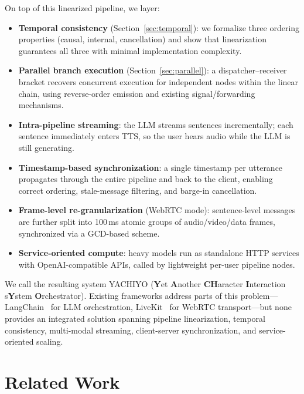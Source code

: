 \documentclass[11pt,a4paper]{article}
\begin{document}
On top of this linearized pipeline, we layer:
\begin{itemize}[nosep]
    \item \textbf{Temporal consistency} (Section~\ref{sec:temporal}): we formalize three ordering properties (causal, internal, cancellation) and show that linearization guarantees all three with minimal implementation complexity.
    \item \textbf{Parallel branch execution} (Section~\ref{sec:parallel}): a dispatcher--receiver bracket recovers concurrent execution for independent nodes within the linear chain, using reverse-order emission and existing signal/forwarding mechanisms.
    \item \textbf{Intra-pipeline streaming}: the LLM streams sentences incrementally; each sentence immediately enters TTS, so the user hears audio while the LLM is still generating.
    \item \textbf{Timestamp-based synchronization}: a single timestamp per utterance propagates through the entire pipeline and back to the client, enabling correct ordering, stale-message filtering, and barge-in cancellation.
    \item \textbf{Frame-level re-granularization} (WebRTC mode): sentence-level messages are further split into 100\,ms atomic groups of audio/video/data frames, synchronized via a GCD-based scheme.
    \item \textbf{Service-oriented compute}: heavy models run as standalone HTTP services with OpenAI-compatible APIs, called by lightweight per-user pipeline nodes.
\end{itemize}

We call the resulting system YACHIYO (\textbf{Y}et \textbf{A}nother \textbf{CH}aracter \textbf{I}nteraction s\textbf{Y}stem \textbf{O}rchestrator). Existing frameworks address parts of this problem---LangChain~\cite{langchain} for LLM orchestration, LiveKit~\cite{livekit} for WebRTC transport---but none provides an integrated solution spanning pipeline linearization, temporal consistency, multi-modal streaming, client-server synchronization, and service-oriented scaling.

\section{Related Work}
\label{sec:related}
\end{document}
